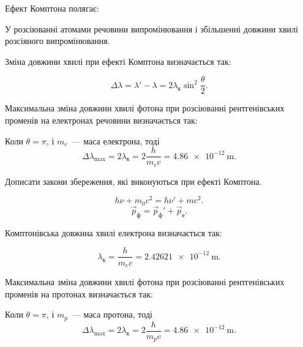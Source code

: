 \documentclass[a4paper,oneside,DIV=12,12pt]{scrartcl}
\begin{document}
	\begin{exercise}
		Ефект Комптона полягає:
	\end{exercise}
	\begin{solution}
		У розсіюванні атомами речовини випромінювання і збільшенні довжини хвилі розсіяного випромінювання.
	\end{solution}
	
	\begin{exercise}
		Зміна довжини хвилі при ефекті Комптона визначається так:
	\end{exercise}
	\begin{solution}
		\[
			\Delta \lambda = \lambda' - \lambda = 2 \lambda_{\text{к}} \sin^2 \frac{\theta}{2}.
		\]
	\end{solution}
	
	\begin{exercise}
		Максимальна зміна довжини хвилі фотона при розсіюванні рентгенівських променів на електронах речовини визначається так:
	\end{exercise}
	\begin{solution}
		Коли $\theta = \pi$, і $m_e$~— маса електрона, тоді
		\[
			\Delta \lambda_{\text{max}}
			= 2 \lambda_{\text{к}}
			= 2 \frac{h}{m_e c}
			= \SI{4,86e-12}{\metre}.
		\]
	\end{solution}
	
	\begin{exercise}
		Дописати закони збереження, які виконуються при ефекті Комптона.
	\end{exercise}
	\begin{solution}
		\[
			h \nu + m_0 c^2 = h \nu' + mc^2.
		\]
		\[
			\vec{p}_{\text{ф}} = \vec{p}_{\text{ф}}' + \vec{p}_{\text{е}}.
		\]
	\end{solution}
	
	\begin{exercise}
		Комптонівська довжина хвилі електрона визначається так:
	\end{exercise}
	\begin{solution}
		\[
			\lambda_{\text{к}}
			= \frac{h}{m_e c}
			= \SI{2,42621e-12}{\metre}.
		\]
	\end{solution}
	
	\begin{exercise}
		Максимальна зміна довжини хвилі фотона при розсіюванні рентгенівських променів на протонах визначається так:
	\end{exercise}
	\begin{solution}
		Коли $\theta = \pi$, і $m_p$~— маса протона, тоді
		\[
			\Delta \lambda_{\text{max}}
			= 2 \lambda_{\text{к}}
			= 2 \frac{h}{m_p c}
			= \SI{4,86e-12}{\metre}.
		\]
	\end{solution}
	
\end{document}
